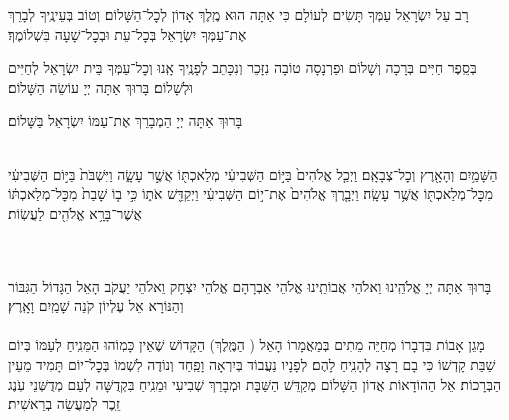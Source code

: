 \documentclass[twoside, openany, parskip=half, 11pt]{book}
\begin{document}
\label{maarivyt}
\ytkiddushhayom{\YTShabboshavdalah}


\sepline

\retzeh

\yaalehveyavo

\zion

\maarivmodim

\shabboschanukah

\shabboshodos

רָב עַל יִשְׂרָאֵל עַמְּךָ תָּשִׂים לְעוֹלָם כִּי אַתָּה הוּא מֶֽלֶךְ אָדוֹן לְכׇל־הַשָּׁלוֹם׃ וְטוֹב בְּעֵינֶֽיךָ לְבָרֵךְ אֶת־עַמְּךָ יִשְׂרָאֵל בְּכׇל־עֵת וּבְכׇל־שָׁעָה בִּשְׁלוֹמֶךָ׃
\vspace{-0.4\baselineskip}
\begin{paracol}{2}

\begin{small}
בְּסֵֽפֶר חַיִּים בְּרָכָה וְשָׁלוֹם וּפַרְנָסָה טוֹבָה נִזָּכֵר וְנִכָּתֵב לְפָנֶֽיךָ אָֽנוּ וְכׇל־עַמְּךָ בֵּית יִשְׂרָאֵל לְחַיִּים וּלְשָׁלוֹם׃ בָּרוּךְ אַתָּה יְיָ עוֹשֵׂה הַשָּׁלוֹם׃
\end{small}


\switchcolumn

בָּרוּךְ אַתָּה יְיָ הַמְבָרֵךְ אֶת־עַמּוֹ יִשְׂרָאֵל בַּשָּׁלוֹם׃

\end{paracol}

\tachanunim


\label{vayachulu}
\\
 
הַשָּׁמַ֥יִם וְהָאָ֖רֶץ וְכׇל־צְבָאָֽם׃ וַיְכַ֤ל אֱלֹהִים֙ בַּיּ֣וֹם הַשְּׁבִיעִ֔י מְלַאכְתּ֖וֹ אֲשֶׁ֣ר עָשָׂ֑ה וַיִּשְׁבֹּת֙ בַּיּ֣וֹם הַשְּׁבִיעִ֔י מִכׇּל־מְלַאכְתּ֖וֹ אֲשֶׁ֥ר עָשָֽׂה׃ וַיְבָ֤רֶךְ אֱלֹהִים֙ אֶת־י֣וֹם הַשְּׁבִיעִ֔י וַיְקַדֵּ֖שׁ אֹת֑וֹ כִּ֣י ב֤וֹ שָׁבַת֙ מִכׇּל־מְלַאכְתּ֔וֹ אֲשֶׁר־בָּרָ֥א אֱלֹהִ֖ים לַעֲשֽׂוֹת׃


\\
\\
בָּרוּךְ אַתָּה יְיָ אֱלֹהֵֽינוּ וֵאלֹהֵי אֲבוֹתֵֽינוּ אֱלֹהֵי אַבְרָהָם אֱלֹהֵי יִצְחָק וֵאלֹהֵי יַעֲקֹב הָאֵל הַגָּדוֹל הַגִּבּוֹר וְהַנּוֹרָא אֵל עֶלְיוֹן קֹנֵה שָׁמַֽיִם וָאָֽרֶץ׃\\
\\
מָגֵן אָבוֹת בִּדְבָרוֹ מְחַיֵּה מֵתִים בְּמַאֲמָרוֹ הָאֵל
( הַמֶּֽלֶךְ)
הַקָּדוֹשׁ שֶׁאֵין כָּמֽוֹהוּ הַמֵּנִֽיחַ לְעַמּוֹ בְּיוֹם שַׁבַּת קָדְשׁוֹ כִּי בָם רָצָה לְהָנִֽיחַ לָהֶם׃ לְפָנָיו נַעֲבוֹד בְּיִרְאָה וָפַֽחַד וְנוֹדֶה לִשְׁמוֹ בְּכׇל־יוֹם תָּמִיד מֵעֵין הַבְּרָכוֹת׃ אֵל הַהוֹדָאוֹת אֲדוֹן הַשָּׁלוֹם מְקַדֵּשׁ הַשַּׁבָּת וּמְבָרֵךְ שְׁבִיעִי וּמֵנִֽיחַ בִּקְדֻשָּׁה לְעַם מְדֻשְּׁנֵי עֹֽנֶג זֵֽכֶר לְמַעֲשֵׂה בְרֵאשִׁית׃
\end{document}
